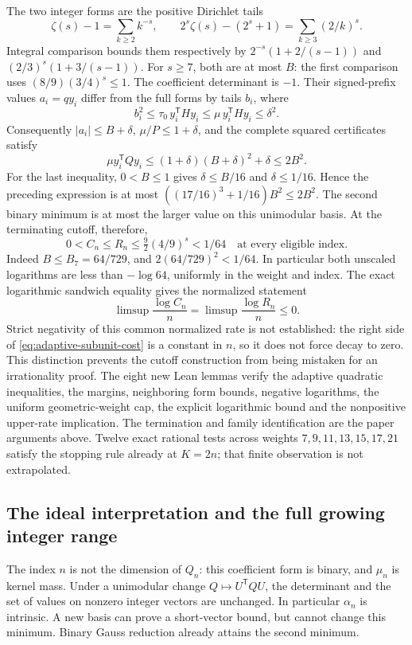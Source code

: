 \documentclass[11pt]{article}
\theoremstyle{remark}
\begin{document}
The two integer forms are the positive Dirichlet tails
\[
 \zeta(s)-1=\sum_{k\ge2}k^{-s},\qquad
 2^s\zeta(s)-(2^s+1)=\sum_{k\ge3}(2/k)^s.
\]
Integral comparison bounds them respectively by
\(2^{-s}(1+2/(s-1))\) and
\((2/3)^s(1+3/(s-1))\). For \(s\ge7\), both are at most \(B\):
the first comparison uses \((8/9)(3/4)^s\le1\).
The coefficient determinant is \(-1\). Their signed-prefix values \(a_i=qy_i\) differ from
the full forms by tails \(b_i\), where
\[
 b_i^2\le\tau_0\,y_i^{\mathsf T}Hy_i
       \le\mu\,y_i^{\mathsf T}Hy_i\le\delta^2.
\]
Consequently \(|a_i|\le B+\delta\),
\(\mu/P\le1+\delta\), and the complete squared certificates satisfy
\[
 \mu y_i^{\mathsf T}Qy_i
 \le(1+\delta)(B+\delta)^2+\delta
 \le2B^2.
\]
For the last inequality, \(0<B\le1\) gives
\(\delta\le B/16\) and \(\delta\le1/16\). Hence the preceding
expression is at most \(((17/16)^3+1/16)B^2\le2B^2\).
The second binary minimum is at most the larger value on this
unimodular basis. At the terminating cutoff, therefore,
\begin{equation}
 0<C_n\le R_n\le\tfrac92(4/9)^s<1/64
 \quad\text{at every eligible index}.
 \label{eq:adaptive-subunit-cost}
\end{equation}
Indeed \(B\le B_7=64/729\), and
\(2(64/729)^2<1/64\). In particular both unscaled logarithms
are less than \(-\log64\), uniformly in the weight and index. The exact
logarithmic sandwich equality gives the normalized statement
\[
 \limsup\frac{\log C_n}{n}
 =\limsup\frac{\log R_n}{n}\le0.
\]
Strict negativity of this common normalized rate is not established:
the right side of \eqref{eq:adaptive-subunit-cost} is a constant in
\(n\), so it does not force decay to zero. This distinction prevents
the cutoff construction from being mistaken for an irrationality proof.
The eight new Lean lemmas verify the adaptive quadratic inequalities,
the margins, neighboring form bounds, negative logarithms, the uniform
geometric-weight cap, the explicit logarithmic bound and the nonpositive upper-rate implication. The termination and family
identification are the paper arguments above. Twelve exact rational
tests across weights \(7,9,11,13,15,17,21\) satisfy the stopping rule
already at \(K=2n\); that finite observation is not extrapolated.

\subsection{The ideal interpretation and the full growing integer range}
The index \(n\) is not the dimension of \(Q_n\): this coefficient form
is binary, and \(\mu_n\) is kernel mass. Under a unimodular change
\(Q\mapsto U^{\mathsf T}QU\), the determinant and the set of values on
nonzero integer vectors are unchanged. In particular \(\alpha_n\) is
intrinsic. A new basis can prove a short-vector bound, but cannot change
this minimum. Binary Gauss reduction already attains the second minimum.
\end{document}
